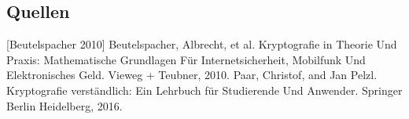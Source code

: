 \newline \newline
{}




\newline \newline
\subsection{Quellen}

[Beutelspacher 2010] Beutelspacher, Albrecht, et al. Kryptografie in Theorie Und Praxis: Mathematische Grundlagen Für Internetsicherheit, Mobilfunk Und Elektronisches Geld. Vieweg + Teubner, 2010. 
\newline
[Paar 2016] Paar, Christof, and Jan Pelzl. Kryptografie verständlich: Ein Lehrbuch für Studierende Und Anwender. Springer Berlin Heidelberg, 2016. 